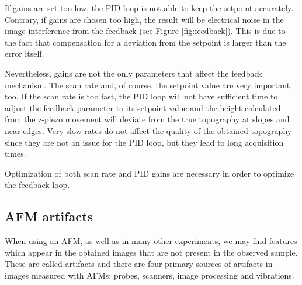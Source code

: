 \documentclass[11pt,a4paper]{article}
\begin{document}
If gains are set too low, the PID loop is not able to keep the setpoint accurately. Contrary, if gains are chosen too high, the result will be electrical noise in the image interference from the feedback (see Figure \ref{fig:feedback}). This is due to the fact that compensation for a deviation from the setpoint is larger than the error itself.

Nevertheless, gains are not the only parameters that affect the feedback mechanism. The scan rate and, of course, the setpoint value are very important, too. If the scan rate is too fast, the PID loop will not have sufficient time to adjust the feedback parameter to its setpoint value and the height calculated from the z-piezo movement will deviate from the true topography at slopes and near edges. Very slow rates do not affect the quality of the obtained topography since they are not an issue for the PID loop, but they lead to long acquisition times.

Optimization of both scan rate and PID gains are necessary in order to optimize the feedback loop.

\subsection{AFM artifacts}
When using an AFM, as well as in many other experiments, we may find features which appear in the obtained images that are not present in the observed sample. These are called artifacts \cite{artifacts} and there are four primary sources of artifacts in images measured with AFMs: probes, scanners, image processing and vibrations.
\end{document}
